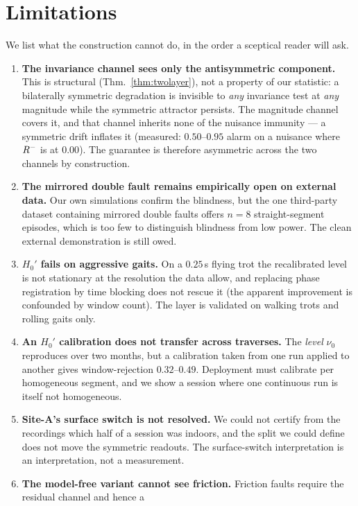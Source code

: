 \section{Limitations}
\label{sec:limitations}

We list what the construction cannot do, in the order a sceptical reader will ask.

\begin{enumerate}
\item \textbf{The invariance channel sees only the antisymmetric component.} This is structural
  (Thm.~\ref{thm:twolayer}), not a property of our statistic: a bilaterally symmetric degradation is invisible to
  \emph{any} invariance test at \emph{any} magnitude while the symmetric attractor persists. The magnitude channel
  covers it, and that channel inherits none of the nuisance immunity --- a symmetric drift inflates it (measured:
  $0.50$--$0.95$ alarm on a nuisance where $R^{-}$ is at $0.00$). The guarantee is therefore asymmetric across the two
  channels by construction.
\item \textbf{The mirrored double fault remains empirically open on external data.} Our own simulations confirm the
  blindness, but the one third-party dataset containing mirrored double faults offers $n=8$ straight-segment episodes,
  which is too few to distinguish blindness from low power. The clean external demonstration is still owed.
\item \textbf{$H_0'$ fails on aggressive gaits.} On a $0.25$\,s flying trot the recalibrated level is not stationary at
  the resolution the data allow, and replacing phase registration by time blocking does not rescue it (the apparent
  improvement is confounded by window count). The layer is validated on walking trots and rolling gaits only.
\item \textbf{An $H_0'$ calibration does not transfer across traverses.} The \emph{level} $\nu_0$ reproduces over two
  months, but a calibration taken from one run applied to another gives window-rejection $0.32$--$0.49$. Deployment must
  calibrate per homogeneous segment, and we show a session where one continuous run is itself not homogeneous.
\item \textbf{Site-A's surface switch is not resolved.} We could not certify from the recordings which half of a session
  was indoors, and the split we could define does not move the symmetric readouts. The surface-switch interpretation is
  an interpretation, not a measurement.
\item \textbf{The model-free variant cannot see friction.} Friction faults require the residual channel and hence a

\end{enumerate}
